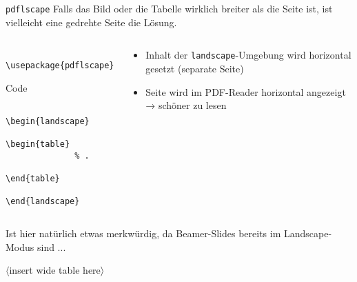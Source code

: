 \begin{frame}[fragile]{\texttt{pdflscape}}
  Falls das Bild oder die Tabelle wirklich breiter als die Seite ist, ist vielleicht eine gedrehte Seite die Lösung.
  \begin{columns}[onlytextwidth, t]
    \begin{column}{0.50\textwidth}
      \begin{Packages}
        \begin{verbatim}
          \usepackage{pdflscape}
        \end{verbatim}
      \end{Packages}
      \begin{block}{Code}
        \begin{verbatim}
          \begin{landscape}
            \begin{table}
              % .
            \end{table}
          \end{landscape}
        \end{verbatim}
      \end{block}
    \end{column}
    \begin{column}{0.46\textwidth}
      \begin{itemize}
        \item Inhalt der \texttt{landscape}-Umgebung wird horizontal gesetzt (separate Seite)
        \item Seite wird im PDF-Reader horizontal angezeigt → schöner zu lesen
      \end{itemize}
    \end{column}
  \end{columns}
  Ist hier natürlich etwas merkwürdig, da Beamer-Slides bereits im Landscape-Modus sind ...
\end{frame}

\begin{landscape}
  \begin{frame}
    \centering
    $\langle$insert wide table here$\rangle$
  \end{frame}
\end{landscape}
